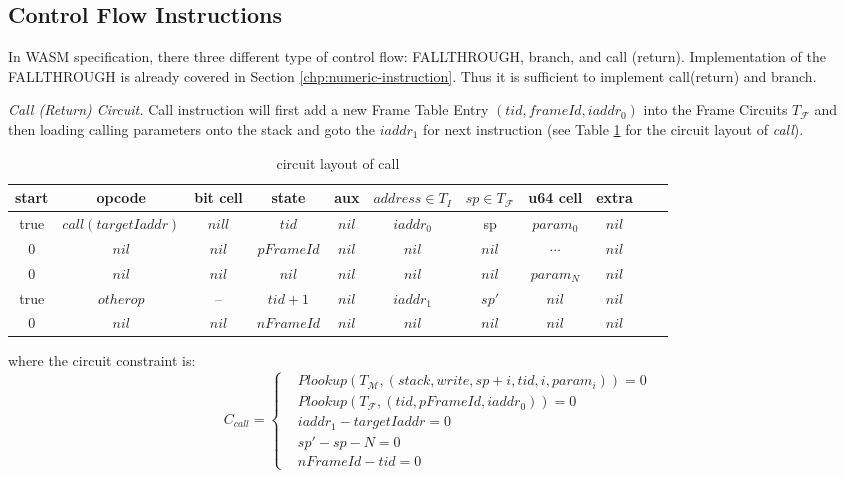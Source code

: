 \subsection{Control Flow Instructions}
In WASM specification, there three different type of control flow: FALLTHROUGH, branch, and call (return). Implementation of the FALLTHROUGH is already covered in Section \ref{chp:numeric-instruction}. Thus it is sufficient to implement call(return) and branch.

\smallskip\noindent\emph{Call (Return) Circuit.}
Call instruction will first add a new Frame Table Entry $(tid, frameId, iaddr_0)$ into the Frame Circuits $T_\mathcal{F}$ and then loading calling parameters onto the stack and goto the $iaddr_1$ for next instruction (see Table \ref{tbl:call-instruction} for the circuit layout of \emph{call}).
\begin{table}[!h]
\begin{center}
\begin{tabular}{ | c | c | c | c | c | c | c | c | c | c | c | }
  \hline
  start & opcode & bit cell & state & aux & $address \in T_{I}$ & $sp \in T_\mathcal{F}$& u64 cell & extra \\ 
  \hline
   true & $call(targetIaddr)$ & $nill$ & $tid$ & $nil$ & $iaddr_0$ & sp & $param_0$ & $nil$\\ 
 \hline
   0 & $nil$ & $nil$ & $pFrameId$ & $nil$ & $nil$ & $nil$ & $\cdots$ & $nil$\\ 
 \hline
   0 & $nil$ & $nil$ & $nil$ & $nil$ & $nil$ & $nil$ & $param_N$ & $nil$\\ 
 \hline
   true & $otherop$ & -- & $tid + 1$ & $nil$ & $iaddr_1$ & $sp'$ & $nil$ & $nil$\\
 \hline
   0 & $nil$ & $nil$ & $nFrameId$ & $nil$ & $nil$ & $nil$ & $nil$ & $nil$\\ 
 \hline
\end{tabular}
\caption{circuit layout of call}
\label{tbl:call-instruction}
\end{center}
\end{table}

\noindent where the circuit constraint is:
\[
    C_{call} = \begin{cases}
        &Plookup(T_\mathcal{M}, (stack, write, sp+i, tid, i, param_i)) = 0 \\
        &Plookup(T_\mathcal{F}, (tid, pFrameId, iaddr_0)) = 0 \\
        &iaddr_1 - targetIaddr = 0\\
        &sp' - sp - N = 0 \\
        &nFrameId - tid = 0
    \end{cases}
\]

